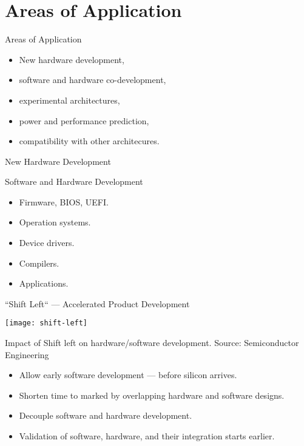\section{Areas of Application}

\begin{frame}{Areas of Application}

\pause
\begin{itemize}
\item New hardware development,
\item software and hardware co-development,
\item experimental architectures,
\item power and performance prediction,
\item compatibility with other architecures.
\end{itemize}

\end{frame}

\begin{frame}{New Hardware Development}


\end{frame}

\begin{frame}{Software and Hardware Development}

\pause
\begin{itemize}
\item Firmware, BIOS, UEFI.
\item Operation systems.
\item Device drivers.
\item Compilers.
\item Applications.
\end{itemize}

\end{frame}

\begin{frame}{``Shift Left`` --- Accelerated Product Development}

\centering

\texttt{[image: shift-left]} %

\begin{tiny}
Impact of Shift left on hardware/software development.
Source: Semiconductor Engineering
\end{tiny}

\vfill

\begin{itemize}
\item Allow early software development --- before silicon arrives.
\item Shorten time to marked by overlapping hardware and software designs.
\item Decouple software and hardware development.
\item Validation of software, hardware, and their integration starts earlier.
\end{itemize}

\end{frame}

